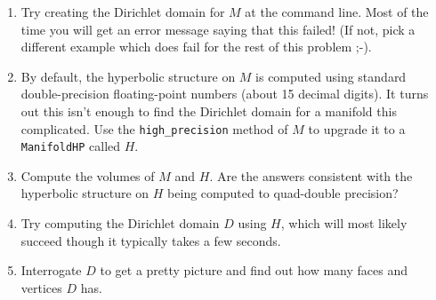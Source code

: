 \documentclass[tikz, a4paper]{nmd/hw}
\begin{document}
\begin{problems}
\begin{enumerate}
    \item Try creating the Dirichlet domain for $M$ at the command
      line.  Most of the time you will get an error message saying
      that this failed!  (If not, pick a different example which does
      fail for the rest of this problem ;-).

    \item By default, the hyperbolic structure on $M$ is computed
      using standard double-precision floating-point numbers (about 15
      decimal digits).  It turns out this isn't enough to find the
      Dirichlet domain for a manifold this complicated.  Use the
      \texttt{high\_precision} method of $M$ to upgrade it to a
      \texttt{ManifoldHP} called $H$. 

    \item Compute the volumes of $M$ and $H$.  Are the answers
      consistent with the hyperbolic structure on $H$ being computed
      to quad-double precision?

    \item Try computing the Dirichlet domain $D$ using $H$, which
      will most likely succeed though it typically takes a few
      seconds. 

    \item Interrogate $D$ to get a pretty picture and find out how
      many faces and vertices $D$ has. 

  \end{enumerate}

\end{problems}
\end{document}
